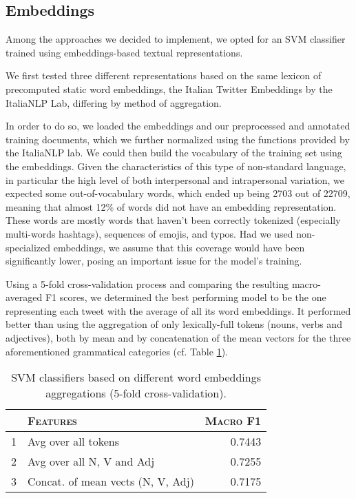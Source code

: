 \subsection{Embeddings}
\label{subsec:Embeddings}
Among the approaches we decided to implement, we opted for an SVM classifier trained using embeddings-based textual representations. 

We first tested three different representations based on the same lexicon of  precomputed static word embeddings, the Italian Twitter Embeddings \cite{italian_twitter_embeddings} by the ItaliaNLP Lab, differing by method of aggregation. 

In order to do so, we loaded the embeddings and our preprocessed and annotated training documents, which we further normalized using the functions provided by the ItaliaNLP lab. We could then build the vocabulary of the training set using the embeddings.
Given the characteristics of this type of non-standard language, in particular the high level of both interpersonal and intrapersonal variation, we expected some out-of-vocabulary words, which ended up being 2703 out of 22709, meaning that almost 12\% of words did not have an embedding representation. These words are mostly words that haven't been correctly tokenized (especially multi-words hashtags), sequences of emojis, and typos. Had we used non-specialized embeddings, we assume that this coverage would have been significantly lower, posing an important issue for the model's training.

Using a 5-fold cross-validation process and comparing the resulting macro-averaged F1 scores, we determined the best performing model to be the one representing each tweet with the average of all its word embeddings. It performed better than using the aggregation of only lexically-full tokens (nouns, verbs and adjectives), both by mean and by concatenation of the mean vectors for the three aforementioned grammatical categories (cf. Table \ref{tbl:svm_f1_static_embs_aggregations}).

\begin{table}
    \begin{tabular}{rlr}
        \toprule
        & \textsc{Features} & \textsc{Macro F1} \\
        \midrule
        1 & Avg over all tokens & 0.7443 \\
        2 & Avg over all N, V and Adj & 0.7255 \\
        3 & Concat. of mean vects (N, V, Adj) & 0.7175 \\
        \bottomrule
    \end{tabular}
    \caption{SVM classifiers based on different word embeddings aggregations (5-fold cross-validation).}
    \label{tbl:svm_f1_static_embs_aggregations}
\end{table}

